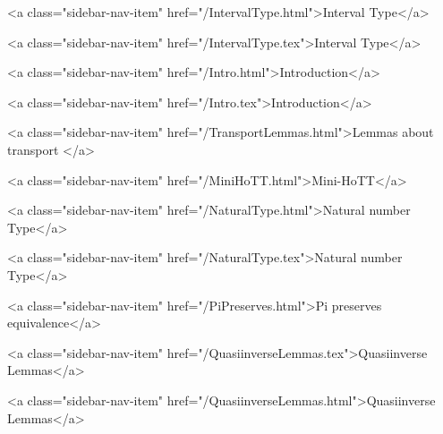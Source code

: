       
        
          <a class="sidebar-nav-item" href="/IntervalType.html">Interval Type</a>
        
      
    
      
        
          <a class="sidebar-nav-item" href="/IntervalType.tex">Interval Type</a>
        
      
    
      
        
          <a class="sidebar-nav-item" href="/Intro.html">Introduction</a>
        
      
    
      
        
          <a class="sidebar-nav-item" href="/Intro.tex">Introduction</a>
        
      
    
      
        
          <a class="sidebar-nav-item" href="/TransportLemmas.html">Lemmas about transport </a>
        
      
    
      
        
          <a class="sidebar-nav-item" href="/MiniHoTT.html">Mini-HoTT</a>
        
      
    
      
        
          <a class="sidebar-nav-item" href="/NaturalType.html">Natural number Type</a>
        
      
    
      
        
          <a class="sidebar-nav-item" href="/NaturalType.tex">Natural number Type</a>
        
      
    
      
        
          <a class="sidebar-nav-item" href="/PiPreserves.html">Pi preserves equivalence</a>
        
      
    
      
        
          <a class="sidebar-nav-item" href="/QuasiinverseLemmas.tex">Quasiinverse Lemmas</a>
        
      
    
      
        
          <a class="sidebar-nav-item" href="/QuasiinverseLemmas.html">Quasiinverse Lemmas</a>
        
